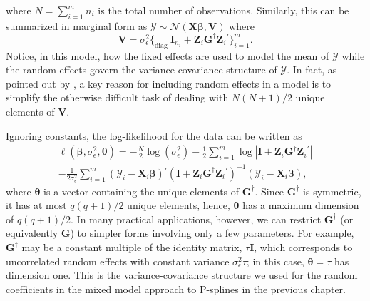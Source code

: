 \documentclass[cmfont,usenames,dvipsnames,leqno]{afit-etd}\usepackage[]{graphicx}\usepackage[]{color}
\newcommand{\trans}{\ensuremath{^\prime}}
\newcommand{\bc}[1]{\ensuremath{\bm{\mathcal{#1}}}}
\newcommand{\mc}[1]{\ensuremath{\mathcal{#1}}}
\newcommand{\X}{\ensuremath{\bm{X}}}
\newcommand{\Z}{\ensuremath{\bm{Z}}}
\begin{document}
  where $N = \sum_{i=1}^m n_i$ is the total number of observations. Similarly, this can be summarized in marginal form as $\bc{Y} \sim \mc{N}\left(\X\bm{\beta}, \bm{V}\right)$ where 
\begin{equation*}
  \bm{V} = \sigma_\epsilon^2\Big\lbrace_{\text{diag }} \bm{I}_{n_i} + \Z_i\bm{G}^\dagger\Z_i\trans \Big\rbrace_{i = 1}^m. 
\end{equation*}  
Notice, in this model, how the fixed effects are used to model the mean of $\bc{Y}$ while the random effects govern the variance-covariance structure of $\bc{Y}$. In fact, as pointed out by \citet{mcculloch_generalized_2008}, a key reason for including random effects in a model is to simplify the otherwise difficult task of dealing with $N(N+1)/2$ unique elements of $\bm{V}$. 

Ignoring constants, the log-likelihood for the data can be written as
\begin{multline}
\label{eqn:lmm-loglik}
  \ell\left(\bm{\beta}, \sigma_\epsilon^2, \bm{\theta}\right) = -\frac{N}{2}\log(\sigma_\epsilon^2) - \frac{1}{2}\sum_{i = 1}^m\log\left|\bm{I} + \Z_i\bm{G}^\dagger\Z_i\trans\right| \\ - \frac{1}{2\sigma_\epsilon^2}\sum_{i = 1}^m \left(\bc{Y}_i - \X_i\bm{\beta}\right)\trans\left(\bm{I} + \Z_i\bm{G}^\dagger\Z_i\trans\right)^{-1}\left(\bc{Y}_i - \X_i\bm{\beta}\right),
\end{multline}
where $\bm{\theta}$ is a vector containing the unique elements of $\bm{G}^\dagger$. Since $\bm{G}^\dagger$ is symmetric, it has at most $q(q+1)/2$ unique elements, hence, $\bm{\theta}$ has a maximum dimension of $q(q+1)/2$. In many practical applications, however, we can restrict $\bm{G}^\dagger$ (or equivalently $\bm{G}$) to simpler forms involving only a few parameters. For example, $\bm{G}^\dagger$ may be a constant multiple of the identity matrix, $\tau\bm{I}$, which corresponds to uncorrelated random effects with constant variance $\sigma_\epsilon^2\tau$; in this case, $\bm{\theta} = \tau$ has dimension one. This is the variance-covariance structure we used for the random coefficients in the mixed model approach to P-splines in the previous chapter.
\end{document}
